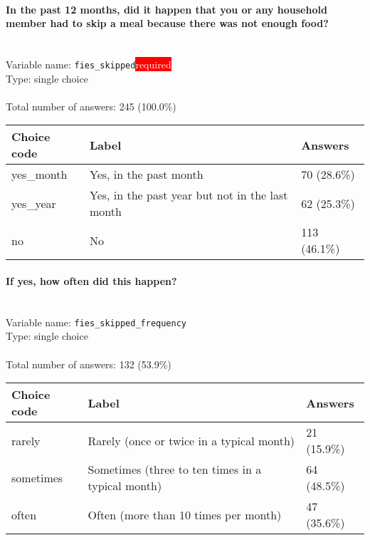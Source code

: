 \documentclass[11.5pt, a4paper]{scrartcl}
\begin{document}
\paragraph{In the past 12 months, did it happen that you or any household member had to skip a meal because there was not enough food? }
\  \\Variable name: \texttt{fies\_skipped}\hfill\colorbox{red}{\small{\textcolor{white}{required}}}\\
 Type: single choice\\
\\Total number of answers: 245 (100.0\%)
\\[0.2em] \begin{tabular}{p{4cm}|p{8cm}|p{3cm}}
Choice code & Label & Answers \\
\hline
yes\_month & Yes, in the past month& \cellcolor{color1}70 (28.6\%)\\
\cellcolor{mygray} yes\_year & \cellcolor{mygray}Yes, in the past year but not in the last month & \cellcolor{color1}62 (25.3\%)\\
no & No& \cellcolor{color2}113 (46.1\%)\\
\end{tabular}
\paragraph{If yes, how often did this happen? }
\  \\Variable name: \texttt{fies\_skipped\_frequency}\\
Type: single choice\\
\\Total number of answers: 132 (53.9\%)
\\[0.2em] \begin{tabular}{p{4cm}|p{8cm}|p{3cm}}
Choice code & Label & Answers \\
\hline
rarely & Rarely (once or twice in a typical month)& \cellcolor{color0}21 (15.9\%)\\
\cellcolor{mygray} sometimes & \cellcolor{mygray}Sometimes (three to ten times in a typical month) & \cellcolor{color2}64 (48.5\%)\\
often & Often (more than 10 times per month)& \cellcolor{color1}47 (35.6\%)\\
\end{tabular}
\end{document}
